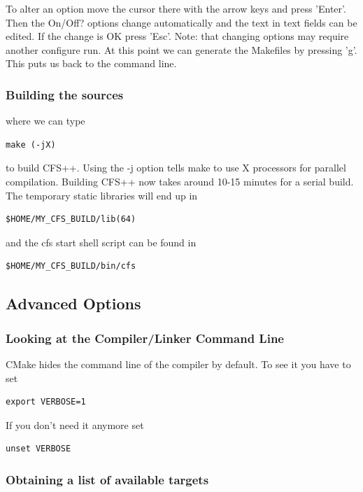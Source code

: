 To alter an option move the cursor there with the arrow keys and press 'Enter'. Then the On/Off?  options change automatically and the text in text fields can be edited. If the change is OK press 'Esc'. Note: that changing options may require another configure run. At this point we can generate the Makefiles by pressing 'g'. This puts us back to the command line.

\subsubsection{Building the sources}

where we can type

\begin{verbatim}
make (-jX)
\end{verbatim}

to build CFS++. Using the -j option tells make to use X processors for parallel compilation. Building CFS++ now takes around 10-15 minutes for a serial build. The temporary static libraries will end up in

\begin{verbatim}
$HOME/MY_CFS_BUILD/lib(64)
\end{verbatim}

and the cfs start shell script can be found in

\begin{verbatim}
$HOME/MY_CFS_BUILD/bin/cfs
\end{verbatim}

\subsection{Advanced Options}

\subsubsection{Looking at the Compiler/Linker Command Line}

CMake hides the command line of the compiler by default. To see it you have to set

\begin{verbatim}
export VERBOSE=1
\end{verbatim}

If you don't need it anymore set

\begin{verbatim}
unset VERBOSE
\end{verbatim}

\subsubsection{Obtaining a list of available targets}

